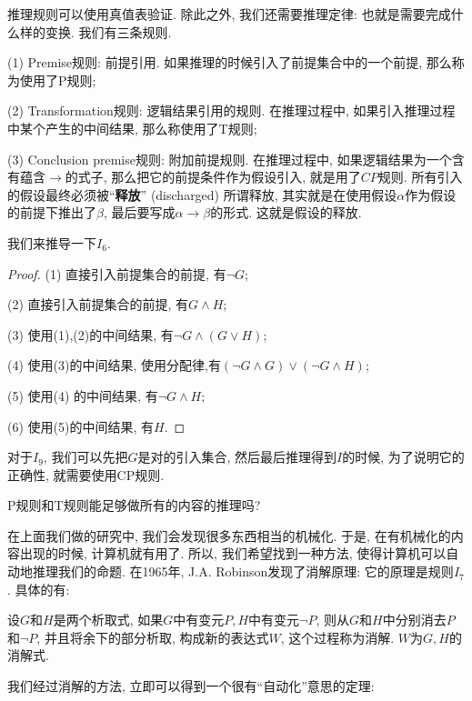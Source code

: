 推理规则可以使用真值表验证. 除此之外, 我们还需要推理定律: 也就是需要完成什么样的变换. 我们有三条规则.


(1) Premise规则: 前提引用. 如果推理的时候引入了前提集合中的一个前提, 那么称为使用了P规则;

(2) Transformation规则: 逻辑结果引用的规则. 在推理过程中, 如果引入推理过程中某个产生的中间结果, 那么称使用了T规则;

(3) Conclusion premise规则: 附加前提规则. 在推理过程中, 如果逻辑结果为一个含有蕴含$\rightarrow$的式子, 那么把它的前提条件作为假设引入, 就是用了$CP$规则. 所有引入的假设最终必须被``{\bf 释放}'' (discharged)
    所谓释放, 其实就是在使用假设$\alpha$作为假设的前提下推出了$\beta$, 最后要写成$\alpha \rightarrow \beta$的形式. 这就是假设的释放. 

我们来推导一下$I_6$. 

\begin{proof}
	(1) 直接引入前提集合的前提, 有$\lnot G$;
	
	(2) 直接引入前提集合的前提, 有$G \land H$;
	
	(3) 使用(1),(2)的中间结果, 有$\lnot G \land (G\lor H)$;
	
	(4) 使用(3)的中间结果, 使用分配律,有$(\lnot G \land G)\lor (\lnot G \land H)$;
	
	(5) 使用(4) 的中间结果, 有$\lnot G \land H$;
	
	(6) 使用(5)的中间结果, 有$H$. 
\end{proof}

对于$I_9$, 我们可以先把$G$是对的引入集合, 然后最后推理得到$I$的时候, 为了说明它的正确性, 就需要使用CP规则. 

\begin{bonus}
	P规则和T规则能足够做所有的内容的推理吗?
\end{bonus}

在上面我们做的研究中, 我们会发现很多东西相当的机械化. 于是, 在有机械化的内容出现的时候, 计算机就有用了. 所以, 我们希望找到一种方法, 使得计算机可以自动地推理我们的命题. 在1965年, J.A. Robinson发现了消解原理: 它的原理是规则$I_7$. 具体的有: 

\begin{definition}[消解与消解式]
	设$G$和$H$是两个析取式, 如果$G$中有变元$P,H$中有变元$\lnot P$, 则从$G$和$H$中分别消去$P$和$\lnot P$, 并且将余下的部分析取, 构成新的表达式$W$, 这个过程称为消解. $W$为$G,H$的消解式. 
\end{definition}

我们经过消解的方法, 立即可以得到一个很有``自动化''意思的定理: 

